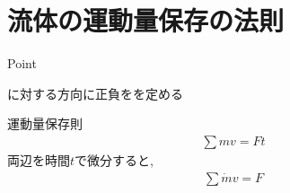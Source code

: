 \documentclass[a4paper]{jsarticle}
\begin{document}
\section{流体の運動量保存の法則}
\begin{itembox}[l]{Point}
    \begin{center}
        に対する方向に正負をを定める\\
    \end{center}
\end{itembox}
\begin{itembox}[l]{運動量保存則}
    \begin{eqnarray*}
        \displaystyle\sum mv=Ft
    \end{eqnarray*}
    両辺を時間$t$で微分すると,
    \begin{eqnarray*}
        \displaystyle\sum \dot{m}v=F\\
    \end{eqnarray*}
\end{itembox}
\end{document}
